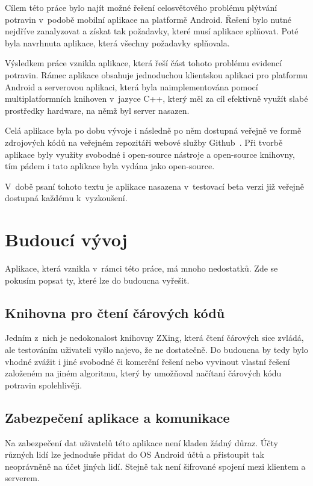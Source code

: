 \documentclass[thesis=B,czech]{FITthesis}[2013/10/20]
\begin{document}
\begin{conclusion}
Cílem této práce bylo najít možné řešení celosvětového problému plýtvání potravin v~podobě mobilní aplikace na platformě Android. Řešení bylo nutné nejdříve zanalyzovat a získat tak požadavky, které musí aplikace splňovat. Poté byla navrhnuta aplikace, která všechny požadavky splňovala.
	
Výsledkem práce vznikla aplikace, která řeší část tohoto problému evidencí potravin. Rámec aplikace obsahuje jednoduchou klientskou aplikaci pro platformu Android a serverovou aplikaci, která byla naimplementována pomocí multiplatformních knihoven v~jazyce C++, který měl za cíl efektivně využít slabé prostředky hardware, na němž byl server nasazen.

Celá aplikace byla po dobu vývoje i následně po něm dostupná veřejně ve formě zdrojových kódů na veřejném repozitáři webové služby Github~\cite{repo}. Při tvorbě aplikace byly využity svobodné i open-source nástroje a open-source knihovny, tím pádem i tato aplikace byla vydána jako open-source.

V~době psaní tohoto textu je aplikace nasazena v~testovací beta verzi již veřejně dostupná každému k~vyzkoušení.

\section{Budoucí vývoj}

Aplikace, která vznikla v~rámci této práce, má mnoho nedostatků. Zde se pokusím popsat ty, které lze do budoucna vyřešit.

\subsection{Knihovna pro čtení čárových kódů}
Jedním z~nich je nedokonalost knihovny ZXing, která čtení čárových sice zvládá, ale testováním uživateli vyšlo najevo, že ne dostatečně. Do budoucna by tedy bylo vhodné zvážit i jiné svobodné či komerční řešení nebo vyvinout vlastní řešení založeném na jiném algoritmu, který by umožňoval načítaní čárových kódu potravin spolehlivěji.

\subsection{Zabezpečení aplikace a komunikace}
Na zabezpečení dat uživatelů této aplikace není kladen žádný důraz. Účty různých lidí lze jednoduše přidat do OS Android účtů a přistoupit tak neoprávněně na účet jiných lidí. Stejně tak není šifrované spojení mezi klientem a serverem.


\end{conclusion}
\end{document}
